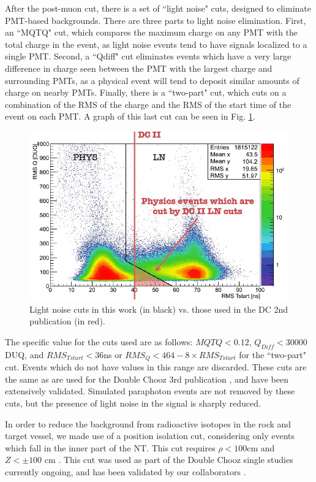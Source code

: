 After the post-muon cut, there is a set of ``light noise" cuts, designed to eliminate PMT-based backgrounds. There are three parts to light noise elimination. First, an ``MQTQ" cut, which compares the maximum charge on any PMT with the total charge in the event, as light noise events tend to have signals localized to a single PMT. Second, a ``Qdiff" cut eliminates events which have a very large difference in charge seen between the PMT with the largest charge and surrounding PMTs, as a physical event will tend to deposit similar amounts of charge on nearby PMTs. Finally, there is a ``two-part" cut, which cuts on a combination of the RMS of the charge and the RMS of the start time of the event on each PMT. A graph of this last cut can be seen in Fig. \ref{LightNoise}.

\begin{figure}
\includegraphics[width=\textwidth]{Paraphotons/Light_Noise_Cuts.jpg}
\caption{Light noise cuts in this work (in black) vs. those used in the DC 2nd publication (in red).}
\label{LightNoise}
\end{figure}

The specific value for the cuts used are as follows: $MQTQ< 0.12$, $Q_{Diff} < 30000$ DUQ, and $RMS_{Tstart} < 36 $ns  or $RMS_{Q} < 464- 8 \times RMS_{Tstart}$ for the ``two-part" cut. Events which do not have values in this range are discarded. These cuts are the same as are used for the Double Chooz 3rd publication \cite{DC_2014}, and have been extensively validated. Simulated paraphoton events are not removed by these cuts, but the presence of light noise in the signal is sharply reduced. 

In order to reduce the background from radioactive isotopes in the rock and target vessel, we made use of a position isolation cut, considering only events which fall in the inner part of the NT. This cut requires $\rho <100 $cm and $Z < \pm 100$ cm . This cut was used as part of the Double Chooz single studies currently ongoing, and has been validated by our collaborators \cite{Mariano}.

